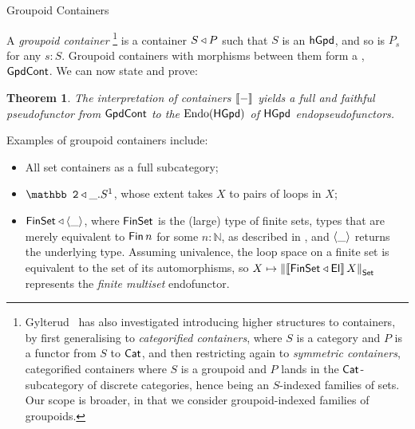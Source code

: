 \documentclass[a4paper]{easychair}
\newtheorem*{theorem}{Theorem}
\begin{document}
\begin{section}{Groupoid Containers}

  A \emph{groupoid container} \footnote{Gylterud~\cite{Gylterud2011}
    has also investigated introducing higher structures to containers,
    by first generalising to \emph{categorified containers}, where
    \(S\) is a category and \(P\) is a functor from \(S\) to \(\mathsf{Cat}\),
    and then restricting again to \emph{symmetric containers}, \ie{}
    categorified containers where \(S\) is a groupoid and \(P\) lands
    in the \(\mathsf{Cat}\)-subcategory of discrete categories, hence being an
  \(S\)-indexed families of sets. Our scope is broader, in that we
consider groupoid-indexed families of groupoids.} is a container
\(S \mathbin{\triangleleft} P\) such that \(S\) is an \(\mathsf{hGpd}\), and so is \(P_s\) for
any \(s : S\). Groupoid containers with morphisms between them form a
\lutc{}, \(\mathsf{GpdCont}\). We can now state and prove:

  \begin{theorem}
    The interpretation of containers \(\llbracket{-}\rrbracket\) yields a full and faithful
    pseudofunctor from \(\mathsf{GpdCont}\) to the \lutc{} \(\operatorname{Endo}(\mathsf{HGpd})\) of \(\mathsf{HGpd}\)
    endopseudofunctors.
  \end{theorem}

Examples of groupoid containers include:

\begin{itemize}
  \item All set containers as a full subcategory;

  \item \(\cont{\mathbb 2}{\_.S^1}\), whose extent takes \(X\) to
    pairs of loops in \(X\);

  \item \(\mathsf{FinSet} \mathbin{\triangleleft} \mathsf{\langle{\_}\rangle}\), where \(\mathsf{FinSet}\) is the
    (large) type of finite sets, \ie{} types that are merely
    equivalent to \(\operatorname{\mathsf{Fin}} n\) for some \(n : \mathbb{N}\), as described
    in \cite[Section 5]{Joram2023}, and \(\langle{\_}\rangle\) returns
    the underlying type. Assuming univalence, the
    loop space on a finite set is equivalent to the set of its
    automorphisms, so \(X \mapsto
    \left\Vert{\llbracket{\mathsf{FinSet}\mathbin{\triangleleft} \mathsf{El}}\rrbracket\, X}\right\Vert_{\mathsf{Set}}\) represents the
    \emph{finite multiset} endofunctor.

\end{itemize}


\end{section}
\end{document}

